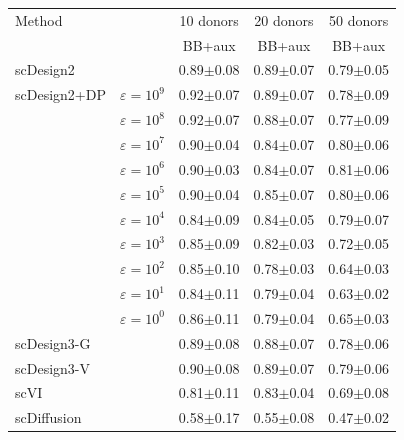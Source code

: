 \begin{tabular}{llccc}
\toprule
Method & & \multicolumn{1}{c}{10 donors} & \multicolumn{1}{c}{20 donors} & \multicolumn{1}{c}{50 donors} \\
 & & BB+aux & BB+aux & BB+aux \\
\midrule
scDesign2 &  & 0.89{\scriptsize$\pm$0.08} & 0.89{\scriptsize$\pm$0.07} & 0.79{\scriptsize$\pm$0.05} \\
\addlinespace[3pt]
scDesign2+DP & $\varepsilon=10^{9}$ & 0.92{\scriptsize$\pm$0.07} & 0.89{\scriptsize$\pm$0.07} & 0.78{\scriptsize$\pm$0.09} \\
 & $\varepsilon=10^{8}$ & 0.92{\scriptsize$\pm$0.07} & 0.88{\scriptsize$\pm$0.07} & 0.77{\scriptsize$\pm$0.09} \\
 & $\varepsilon=10^{7}$ & 0.90{\scriptsize$\pm$0.04} & 0.84{\scriptsize$\pm$0.07} & 0.80{\scriptsize$\pm$0.06} \\
 & $\varepsilon=10^{6}$ & 0.90{\scriptsize$\pm$0.03} & 0.84{\scriptsize$\pm$0.07} & 0.81{\scriptsize$\pm$0.06} \\
 & $\varepsilon=10^{5}$ & 0.90{\scriptsize$\pm$0.04} & 0.85{\scriptsize$\pm$0.07} & 0.80{\scriptsize$\pm$0.06} \\
 & $\varepsilon=10^{4}$ & 0.84{\scriptsize$\pm$0.09} & 0.84{\scriptsize$\pm$0.05} & 0.79{\scriptsize$\pm$0.07} \\
 & $\varepsilon=10^{3}$ & 0.85{\scriptsize$\pm$0.09} & 0.82{\scriptsize$\pm$0.03} & 0.72{\scriptsize$\pm$0.05} \\
 & $\varepsilon=10^{2}$ & 0.85{\scriptsize$\pm$0.10} & 0.78{\scriptsize$\pm$0.03} & 0.64{\scriptsize$\pm$0.03} \\
 & $\varepsilon=10^{1}$ & 0.84{\scriptsize$\pm$0.11} & 0.79{\scriptsize$\pm$0.04} & 0.63{\scriptsize$\pm$0.02} \\
 & $\varepsilon=10^{0}$ & 0.86{\scriptsize$\pm$0.11} & 0.79{\scriptsize$\pm$0.04} & 0.65{\scriptsize$\pm$0.03} \\
\addlinespace[3pt]
scDesign3-G &  & 0.89{\scriptsize$\pm$0.08} & 0.88{\scriptsize$\pm$0.07} & 0.78{\scriptsize$\pm$0.06} \\
\addlinespace[3pt]
scDesign3-V &  & 0.90{\scriptsize$\pm$0.08} & 0.89{\scriptsize$\pm$0.07} & 0.79{\scriptsize$\pm$0.06} \\
\addlinespace[3pt]
scVI &  & 0.81{\scriptsize$\pm$0.11} & 0.83{\scriptsize$\pm$0.04} & 0.69{\scriptsize$\pm$0.08} \\
\addlinespace[3pt]
scDiffusion &  & 0.58{\scriptsize$\pm$0.17} & 0.55{\scriptsize$\pm$0.08} & 0.47{\scriptsize$\pm$0.02} \\

\end{tabular}
